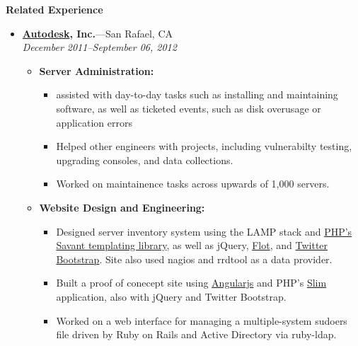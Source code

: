 \documentclass[11pt,oneside]{article}
\newenvironment{ressection}[1]{
	\vspace{4pt}
	{\textbf{\LARGE {\bigtxt #1}}}
	\begin{itemize}
	\vspace{2pt}
}{
	\end{itemize}
}
\newcommand{\resitem}[1]{
	\vspace{2.1pt}
	\item \begin{flushleft} #1 \end{flushleft}
}
\newcommand{\resbigitem}[3]{
	\vspace{-5pt}
	\item
	\textbf{#1}---#2 \\
	\textit{#3}
}
\newenvironment{ressubsec}[3]{
	\resbigitem{#1}{#2}{#3}
	\vspace{-4pt}
	\begin{itemize}
}{
	\end{itemize}
}
\newenvironment{reslist}[1]{
	\resitem{\textbf{#1}}
	\vspace{0pt}
	\begin{itemize}
}{
	\end{itemize}
}
\begin{document}
\begin{ressection}{Related Experience}

		\begin{ressubsec}{\href{http://usa.autodesk.com/}{\autodesk Autodesk}, Inc.}{San Rafael, CA}{December 
				2011--September 06, 2012}
				\begin{reslist}{Server Administration:}
						\resitem {assisted with day-to-day tasks such as 
						installing and maintaining software, as well as ticketed
						events, such as disk overusage or application errors}

						\resitem {Helped other engineers with projects, including 
						vulnerabilty testing, upgrading consoles, and data 
						collections.}

						\resitem {Worked on maintainence tasks across upwards of 
						1,000 servers.}

				\end{reslist}

				\begin{reslist}{Website Design and Engineering:}
						\resitem {Designed server inventory system using the
						LAMP stack and \href{http://phpsavant.com/}
						{PHP's Savant templating library}, as well as jQuery, 
						\href{http://people.iola.dk/olau/flot/examples}{Flot}, 
						and \href{http://twitter.github.com/bootstrap/index.html}
						{Twitter Bootstrap}. Site also used nagios and 
						rrdtool as a data provider.}

						\resitem {Built a proof of conecept site using 
						\href{http://angularjs.org/}{Angularjs}
						and PHP's \href{http://slimframework.com/}{Slim} 
						application, also with jQuery and Twitter 
						Bootstrap.}

						\resitem {Worked on a web interface for managing a 
						multiple-system sudoers file driven by Ruby on Rails 
						and Active Directory via ruby-ldap.}

				\end{reslist}

		\end{ressubsec}
\end{ressection}
\end{document}
